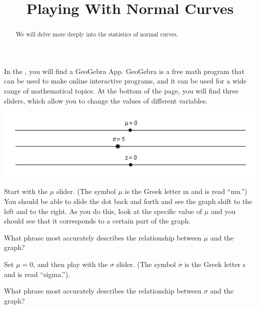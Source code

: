 \documentclass{ximera}
\title{Playing With Normal Curves}
\begin{document}
\begin{abstract}
We will delve more deeply into the statistics of normal curves.
\end{abstract}
\maketitle

In the , you will find a GeoGebra App. GeoGebra is a free math program that can be used to make online interactive programs, and it can be used for a wide range of mathematical topics. At the bottom of the page, you will find three sliders, which allow you to change the values of different variables.

\begin{center}
\includegraphics[scale=0.75]{Sliders.png}
\end{center}

Start with the $\mu$ slider. (The symbol $\mu$ is the Greek letter m and is read ``mu.'') You should be able to slide the dot back and forth and see the graph shift to the left and to the right. As you do this, look at the specific value of $\mu$ and you should see that it corresponds to a certain part of the graph.

\begin{question}
What phrase most accurately describes the relationship between $\mu$ and the graph?

    \begin{multipleChoice}
    \end{multipleChoice}

\end{question}

Set $\mu = 0$, and then play with the $\sigma$ slider. (The symbol $\sigma$ is the Greek letter s and is read ``sigma.''). 

\begin{question}
What phrase most accurately describes the relationship between $\sigma$ and the graph?

    \begin{multipleChoice}
    \end{multipleChoice}

\end{question}
\end{document}
